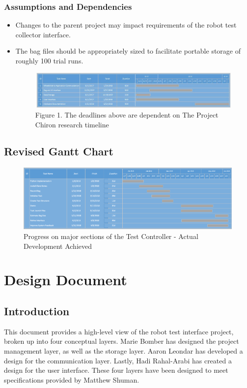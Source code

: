 \documentclass[onecolumn, draftclsnofoot,10pt, compsoc]{report}
\begin{document}
	\subsection{Assumptions and Dependencies}
	\begin{itemize}
		\item Changes to the parent project may impact requirements of the robot test collector interface.
		\item The bag files should be appropriately sized to facilitate portable storage of roughly 100 trial runs.
		\begin{figure}[h!]
			
			\centering
			\includegraphics[width=\linewidth, scale=0.7]{PrelimGanttChart.jpg}
			Figure 1. The deadlines above are dependent on The Project Chiron research timeline
		\end{figure}
		
	\end{itemize}
	
\section{Revised Gantt Chart}

\begin{figure}[h]
	\centering
	\includegraphics[width=0.7\linewidth]{"Revised Gantt"}
	\caption{Progress on major sections of the Test Controller - Actual Development Achieved}
	\label{fig:revised-gantt}
\end{figure}


\chapter{Design Document}
\minitoc

\section{Introduction}
This document provides a high-level view of the robot test interface project, broken up into four conceptual layers. Marie Bomber has designed the project management layer, as well as the storage layer. Aaron Leondar has developed a design for the communication layer. Lastly, Hadi Rahal-Arabi has created a design for the user interface. These four layers have been designed to meet specifications provided by Matthew Shuman.
\end{document}
